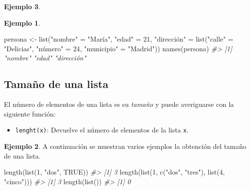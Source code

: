 \documentclass[
]{book}
\newenvironment{Shaded}{\begin{snugshade}}{\end{snugshade}}
\newcommand{\CommentTok}[1]{\textcolor[rgb]{0.56,0.35,0.01}{\textit{#1}}}
\newcommand{\ConstantTok}[1]{\textcolor[rgb]{0.00,0.00,0.00}{#1}}
\newcommand{\DecValTok}[1]{\textcolor[rgb]{0.00,0.00,0.81}{#1}}
\newcommand{\FunctionTok}[1]{\textcolor[rgb]{0.00,0.00,0.00}{#1}}
\newcommand{\NormalTok}[1]{#1}
\newcommand{\OtherTok}[1]{\textcolor[rgb]{0.56,0.35,0.01}{#1}}
\newcommand{\StringTok}[1]{\textcolor[rgb]{0.31,0.60,0.02}{#1}}
\providecommand{\tightlist}{%
  \setlength{\itemsep}{0pt}\setlength{\parskip}{0pt}}
\theoremstyle{definition}
\theoremstyle{definition}
\newtheorem{example}{Ejemplo}[chapter]
\theoremstyle{definition}
\theoremstyle{definition}
\theoremstyle{remark}
\begin{document}
\begin{example}
\begin{example}
\begin{Shaded}
\begin{Highlighting}[]
\NormalTok{persona }\OtherTok{\textless{}{-}} \FunctionTok{list}\NormalTok{(}\StringTok{"nombre"} \OtherTok{=} \StringTok{"María"}\NormalTok{, }\StringTok{"edad"} \OtherTok{=} \DecValTok{21}\NormalTok{, }\StringTok{"dirección"} \OtherTok{=} \FunctionTok{list}\NormalTok{(}\StringTok{"calle"} \OtherTok{=} \StringTok{"Delicias"}\NormalTok{, }\StringTok{"número"} \OtherTok{=} \DecValTok{24}\NormalTok{, }\StringTok{"municipio"} \OtherTok{=} \StringTok{"Madrid"}\NormalTok{))}
\FunctionTok{names}\NormalTok{(persona)}
\CommentTok{\#\textgreater{} [1] "nombre"    "edad"      "dirección"}
\end{Highlighting}
\end{Shaded}

\end{example}

\hypertarget{tamauxf1o-de-una-lista}{%
\subsection{Tamaño de una lista}\label{tamauxf1o-de-una-lista}}

El número de elementos de una lista es su \emph{tamaño} y puede averiguarse con la siguiente función:

\begin{itemize}
\tightlist
\item
  \texttt{lenght(x)}: Devuelve el número de elementos de la lista \texttt{x}.
\end{itemize}

\begin{example}

A continuación se muestran varios ejemplos la obtención del tamaño de una lista.

\begin{Shaded}
\begin{Highlighting}[]
\FunctionTok{length}\NormalTok{(}\FunctionTok{list}\NormalTok{(}\DecValTok{1}\NormalTok{, }\StringTok{"dos"}\NormalTok{, }\ConstantTok{TRUE}\NormalTok{))}
\CommentTok{\#\textgreater{} [1] 3}
\FunctionTok{length}\NormalTok{(}\FunctionTok{list}\NormalTok{(}\DecValTok{1}\NormalTok{, }\FunctionTok{c}\NormalTok{(}\StringTok{"dos"}\NormalTok{, }\StringTok{"tres"}\NormalTok{), }\FunctionTok{list}\NormalTok{(}\DecValTok{4}\NormalTok{, }\StringTok{"cinco"}\NormalTok{)))}
\CommentTok{\#\textgreater{} [1] 3}
\FunctionTok{length}\NormalTok{(}\FunctionTok{list}\NormalTok{())}
\CommentTok{\#\textgreater{} [1] 0}
\end{Highlighting}
\end{Shaded}


\end{example}
\end{example}
\end{document}
